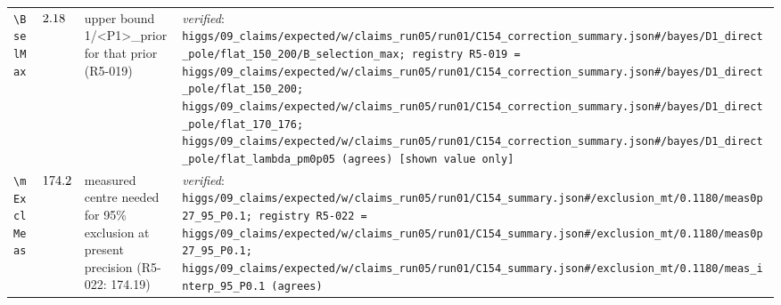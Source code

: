 {\begin{longtable}{@{}>{\raggedright\arraybackslash}p{}>{\raggedright\arraybackslash}p{}>{\raggedright\arraybackslash}p{}>{\raggedright\arraybackslash}p{}@{}}
\texttt{\textbackslash BselMax} & $2.18$ & upper bound 1/\allowbreak{}\textless{}P1\textgreater{}\_\allowbreak{}prior for that prior (R5-019) & \emph{verified}: \texttt{higgs/\allowbreak{}09\_\allowbreak{}claims/\allowbreak{}expected/\allowbreak{}w/\allowbreak{}claims\_\allowbreak{}run05/\allowbreak{}run01/\allowbreak{}C154\_\allowbreak{}correction\_\allowbreak{}summary.json\#/\allowbreak{}bayes/\allowbreak{}D1\_\allowbreak{}direct\_\allowbreak{}pole/\allowbreak{}flat\_\allowbreak{}150\_\allowbreak{}200/\allowbreak{}B\_\allowbreak{}selection\_\allowbreak{}max; registry R5-019 = higgs/\allowbreak{}09\_\allowbreak{}claims/\allowbreak{}expected/\allowbreak{}w/\allowbreak{}claims\_\allowbreak{}run05/\allowbreak{}run01/\allowbreak{}C154\_\allowbreak{}correction\_\allowbreak{}summary.json\#/\allowbreak{}bayes/\allowbreak{}D1\_\allowbreak{}direct\_\allowbreak{}pole/\allowbreak{}flat\_\allowbreak{}150\_\allowbreak{}200; higgs/\allowbreak{}09\_\allowbreak{}claims/\allowbreak{}expected/\allowbreak{}w/\allowbreak{}claims\_\allowbreak{}run05/\allowbreak{}run01/\allowbreak{}C154\_\allowbreak{}correction\_\allowbreak{}summary.json\#/\allowbreak{}bayes/\allowbreak{}D1\_\allowbreak{}direct\_\allowbreak{}pole/\allowbreak{}flat\_\allowbreak{}170\_\allowbreak{}176; higgs/\allowbreak{}09\_\allowbreak{}claims/\allowbreak{}expected/\allowbreak{}w/\allowbreak{}claims\_\allowbreak{}run05/\allowbreak{}run01/\allowbreak{}C154\_\allowbreak{}correction\_\allowbreak{}summary.json\#/\allowbreak{}bayes/\allowbreak{}D1\_\allowbreak{}direct\_\allowbreak{}pole/\allowbreak{}flat\_\allowbreak{}lambda\_\allowbreak{}pm0p05 (agrees) [shown value only]} \\
\texttt{\textbackslash mExclMeas} & $174.2$ & measured centre needed for 95\% exclusion at present precision (R5-022: 174.19) & \emph{verified}: \texttt{higgs/\allowbreak{}09\_\allowbreak{}claims/\allowbreak{}expected/\allowbreak{}w/\allowbreak{}claims\_\allowbreak{}run05/\allowbreak{}run01/\allowbreak{}C154\_\allowbreak{}summary.json\#/\allowbreak{}exclusion\_\allowbreak{}mt/\allowbreak{}0.1180/\allowbreak{}meas0p27\_\allowbreak{}95\_\allowbreak{}P0.1; registry R5-022 = higgs/\allowbreak{}09\_\allowbreak{}claims/\allowbreak{}expected/\allowbreak{}w/\allowbreak{}claims\_\allowbreak{}run05/\allowbreak{}run01/\allowbreak{}C154\_\allowbreak{}summary.json\#/\allowbreak{}exclusion\_\allowbreak{}mt/\allowbreak{}0.1180/\allowbreak{}meas0p27\_\allowbreak{}95\_\allowbreak{}P0.1; higgs/\allowbreak{}09\_\allowbreak{}claims/\allowbreak{}expected/\allowbreak{}w/\allowbreak{}claims\_\allowbreak{}run05/\allowbreak{}run01/\allowbreak{}C154\_\allowbreak{}summary.json\#/\allowbreak{}exclusion\_\allowbreak{}mt/\allowbreak{}0.1180/\allowbreak{}meas\_\allowbreak{}interp\_\allowbreak{}95\_\allowbreak{}P0.1 (agrees)} \\

\end{longtable}}
